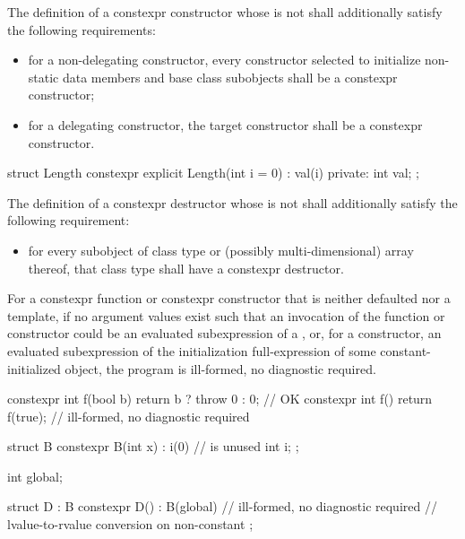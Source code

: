 \pnum
{}%
The definition of a constexpr constructor
whose  is not 
shall additionally satisfy the following requirements:
\begin{itemize}

\item
for a non-delegating constructor, every constructor selected to initialize non-static
data members and base class subobjects shall be a constexpr constructor;

\item
for a delegating constructor, the target constructor shall be a constexpr
constructor.
\end{itemize}

\begin{example}
\begin{codeblock}
struct Length {
  constexpr explicit Length(int i = 0) : val(i) { }
private:
  int val;
};
\end{codeblock}
\end{example}

\pnum
The definition of a constexpr destructor
whose  is not 
shall additionally satisfy the following requirement:
\begin{itemize}
\item
  for every subobject of class type or
  (possibly multi-dimensional) array thereof,
  that class type shall have a constexpr destructor.
\end{itemize}

\pnum
For a constexpr function or constexpr constructor
that is neither defaulted nor a template,
if no argument values exist such that
an invocation of the function or constructor could be an evaluated subexpression of a
, or,
for a constructor, an evaluated subexpression of
the initialization full-expression of some constant-initialized object,
the program is ill-formed, no diagnostic required.
\begin{example}
\begin{codeblock}
constexpr int f(bool b)
  { return b ? throw 0 : 0; }           // OK
constexpr int f() { return f(true); }   // ill-formed, no diagnostic required

struct B {
  constexpr B(int x) : i(0) { }         //  is unused
  int i;
};

int global;

struct D : B {
  constexpr D() : B(global) { }         // ill-formed, no diagnostic required
                                        // lvalue-to-rvalue conversion on non-constant 
};
\end{codeblock}
\end{example}

